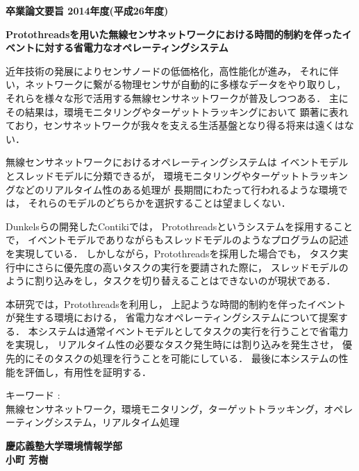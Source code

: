 \begin{center}
\textbf{\Large 卒業論文要旨 2014年度(平成26年度)}

\vspace{6.18mm}

\textbf{\Large Protothreadsを用いた無線センサネットワークにおける時間的制約を伴ったイベントに対する省電力なオペレーティングシステム}
\end{center}

\vspace{10mm}
近年技術の発展によりセンサノードの低価格化，高性能化が進み，
それに伴い，ネットワークに繋がる物理センサが自動的に多様なデータをやり取りし，
それらを様々な形で活用する無線センサネットワークが普及しつつある．
主にその結果は，環境モニタリングやターゲットトラッキングにおいて
顕著に表れており，センサネットワークが我々を支える生活基盤となり得る将来は遠くはない．

無線センサネットワークにおけるオペレーティングシステムは
イベントモデルとスレッドモデルに分類できるが，
環境モニタリングやターゲットトラッキングなどのリアルタイム性のある処理が
長期間にわたって行われるような環境では，
それらのモデルのどちらかを選択することは望ましくない．

Dunkelsらの開発したContikiでは，
Protothreadsというシステムを採用することで，
イベントモデルでありながらもスレッドモデルのようなプログラムの記述を実現している．
しかしながら，Protothreadsを採用した場合でも，
タスク実行中にさらに優先度の高いタスクの実行を要請された際に，
スレッドモデルのように割り込みをし，タスクを切り替えることはできないのが現状である．

本研究では，Protothreadsを利用し，
上記ような時間的制約を伴ったイベントが発生する環境における，
省電力なオペレーティングシステムについて提案する．
本システムは通常イベントモデルとしてタスクの実行を行うことで省電力を実現し，
リアルタイム性の必要なタスク発生時には割り込みを発生させ，
優先的にそのタスクの処理を行うことを可能にしている．
最後に本システムの性能を評価し，有用性を証明する．


\vspace{10mm}
キーワード :\\
\hspace{3.5em}無線センサネットワーク，環境モニタリング，ターゲットトラッキング，オペレーティングシステム，リアルタイム処理

\begin{flushright}
\textbf{慶応義塾大学環境情報学部}\\
\textbf{小町 芳樹}
\end{flushright}

